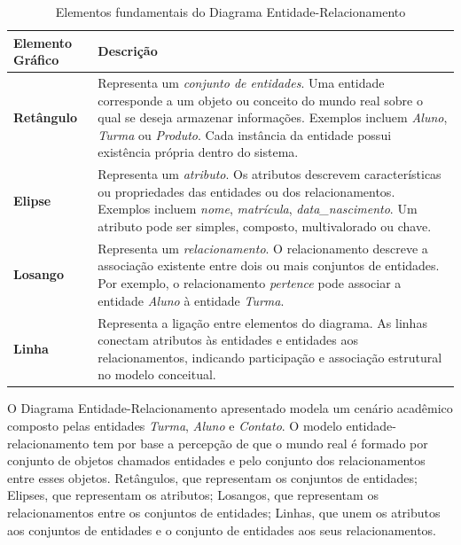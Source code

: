 \begin{table}[h!]
\centering
\renewcommand{\arraystretch}{1.4}
\begin{tabular}{|p{3.5cm}|p{9cm}|}
\hline
\textbf{Elemento Gráfico} & \textbf{Descrição} \\ \hline

\textbf{Retângulo} &
Representa um \textit{conjunto de entidades}. Uma entidade corresponde a um objeto ou conceito do mundo real sobre o qual se deseja armazenar informações. Exemplos incluem \textit{Aluno}, \textit{Turma} ou \textit{Produto}. Cada instância da entidade possui existência própria dentro do sistema. \\ \hline

\textbf{Elipse} &
Representa um \textit{atributo}. Os atributos descrevem características ou propriedades das entidades ou dos relacionamentos. Exemplos incluem \textit{nome}, \textit{matrícula}, \textit{data\_nascimento}. Um atributo pode ser simples, composto, multivalorado ou chave. \\ \hline

\textbf{Losango} &
Representa um \textit{relacionamento}. O relacionamento descreve a associação existente entre dois ou mais conjuntos de entidades. Por exemplo, o relacionamento \textit{pertence} pode associar a entidade \textit{Aluno} à entidade \textit{Turma}. \\ \hline

\textbf{Linha} &
Representa a ligação entre elementos do diagrama. As linhas conectam atributos às entidades e entidades aos relacionamentos, indicando participação e associação estrutural no modelo conceitual. \\ \hline

\end{tabular}

\caption{Elementos fundamentais do Diagrama Entidade-Relacionamento}
\label{tab:elementos_der}

\end{table}
O Diagrama Entidade-Relacionamento apresentado modela um cenário acadêmico composto pelas entidades \textit{Turma}, \textit{Aluno} e \textit{Contato}. O modelo entidade-relacionamento tem por base a percepção de que o mundo real é formado por conjunto de objetos chamados entidades e pelo conjunto dos relacionamentos entre esses objetos. Retângulos, que representam os conjuntos de entidades; Elipses, que representam os atributos; Losangos, que representam os relacionamentos entre os conjuntos de entidades; Linhas, que unem os atributos aos conjuntos de entidades e o conjunto de entidades aos seus relacionamentos.

